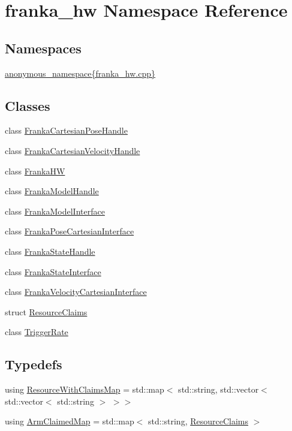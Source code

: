 \hypertarget{namespacefranka__hw}{}\section{franka\+\_\+hw Namespace Reference}
\label{namespacefranka__hw}
\subsection*{Namespaces}
\begin{DoxyCompactItemize}
\item 
 \hyperlink{namespacefranka__hw_1_1anonymous__namespace_02franka__hw_8cpp_03}{anonymous\+\_\+namespace\{franka\+\_\+hw.\+cpp\}}
\end{DoxyCompactItemize}
\subsection*{Classes}
\begin{DoxyCompactItemize}
\item 
class \hyperlink{classfranka__hw_1_1FrankaCartesianPoseHandle}{Franka\+Cartesian\+Pose\+Handle}
\item 
class \hyperlink{classfranka__hw_1_1FrankaCartesianVelocityHandle}{Franka\+Cartesian\+Velocity\+Handle}
\item 
class \hyperlink{classfranka__hw_1_1FrankaHW}{Franka\+HW}
\item 
class \hyperlink{classfranka__hw_1_1FrankaModelHandle}{Franka\+Model\+Handle}
\item 
class \hyperlink{classfranka__hw_1_1FrankaModelInterface}{Franka\+Model\+Interface}
\item 
class \hyperlink{classfranka__hw_1_1FrankaPoseCartesianInterface}{Franka\+Pose\+Cartesian\+Interface}
\item 
class \hyperlink{classfranka__hw_1_1FrankaStateHandle}{Franka\+State\+Handle}
\item 
class \hyperlink{classfranka__hw_1_1FrankaStateInterface}{Franka\+State\+Interface}
\item 
class \hyperlink{classfranka__hw_1_1FrankaVelocityCartesianInterface}{Franka\+Velocity\+Cartesian\+Interface}
\item 
struct \hyperlink{structfranka__hw_1_1ResourceClaims}{Resource\+Claims}
\item 
class \hyperlink{classfranka__hw_1_1TriggerRate}{Trigger\+Rate}
\end{DoxyCompactItemize}
\subsection*{Typedefs}
\begin{DoxyCompactItemize}
\item 
using \hyperlink{namespacefranka__hw_a1fae0c56c9a08fdeb137e601f876cc77}{Resource\+With\+Claims\+Map} = std\+::map$<$ std\+::string, std\+::vector$<$ std\+::vector$<$ std\+::string $>$ $>$$>$
\item 
using \hyperlink{namespacefranka__hw_a9b9c672b3e064953e816024fc2f9cf0f}{Arm\+Claimed\+Map} = std\+::map$<$ std\+::string, \hyperlink{structfranka__hw_1_1ResourceClaims}{Resource\+Claims} $>$
\end{DoxyCompactItemize}
